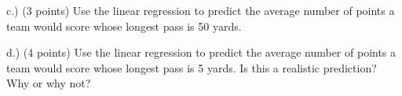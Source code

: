 \documentclass[11pt]{article}
\begin{document}
\begin{questions}
c.) (3 points)   Use the linear regression to predict the average number of points a team would score whose longest pass is 50 yards.
\vspace{1.25in}

\nextpage

d.) (4 points) Use the linear regression to predict the average number of points a team would score whose longest pass is 5 yards.  Is this a realistic prediction?  Why or why not?





\mbox{}
\end{questions}
\end{document}
